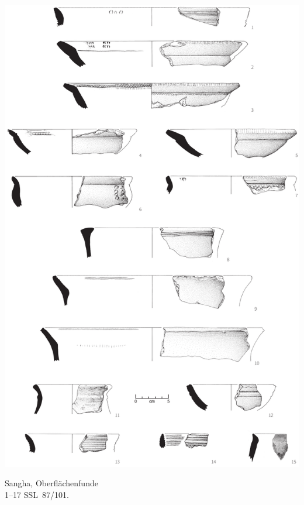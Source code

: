 \begin{pl}[H]
	\includegraphics{plt/Taf37.pdf}
	\vspace{.75em}\caption{\mbox{Sangha}, Oberflächenfunde \\ 1--17 SSL~87/101.}
	\label{pl:37}
\end{pl}


